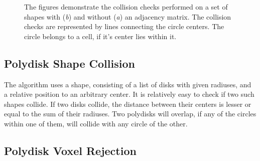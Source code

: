 \documentclass[12pt, oneside]{report}
\begin{document}
\begin{figure}[H]
\caption{The figures demonstrate the collision checks performed on a set of shapes with (\textit{b}) and without (\textit{a}) an adjacency matrix. The collision checks are represented by lines connecting the circle centers. The circle belongs to a cell, if it's center lies within it.}
\end{figure}

\subsection{Polydisk Shape Collision}

The algorithm uses a shape, consisting of a list of disks with given radiuses, and a relative position to an arbitrary center. It is relatively easy to check if two such shapes collide. \newline
If two disks collide, the distance between their centers is lesser or equal to the sum of their radiuses. Two polydisks will overlap, if any of the circles within one of them, will collide with any circle of the other.

\subsection{Polydisk Voxel Rejection}
\end{document}
